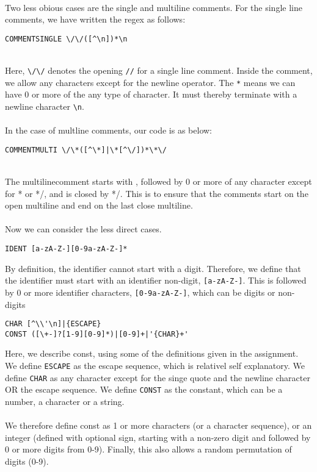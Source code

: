 \documentclass{article}
\begin{document}
\\
Two less obious cases are the single and multiline comments. For the single line comments, we have written the regex as follows:
\begin{verbatim}
COMMENTSINGLE \/\/([^\n])*\n
\end{verbatim}
\\
Here, \verb|\/\/| denotes the opening \verb|//| for a single line comment. Inside the comment, we allow any characters except for the newline operator. The \verb|*| means we can have 0 or more of the any type of character. It must thereby terminate with a newline character \verb|\n|.\\
\\
In the case of multline comments, our code is as below:
\begin{verbatim}
COMMENTMULTI \/\*([^\*]|\*[^\/])*\*\/
\end{verbatim}
\\
The multilinecomment starts with \*, followed by 0 or more of any character except for * or */, and is closed by */. This is to ensure that the comments start on the open multiline and end on the last close multiline.\\
\\
Now we can consider the less direct cases.
\begin{verbatim}
IDENT [a-zA-Z-][0-9a-zA-Z-]*
\end{verbatim}
By definition, the identifier cannot start with a digit. Therefore, we define that the identifier must start with an identifier non-digit, \verb|[a-zA-Z-]|. This is followed by 0 or more identifier characters, \verb|[0-9a-zA-Z-]|, which can be digits or non-digits
\begin{verbatim}
CHAR [^\\'\n]|{ESCAPE}
CONST ([\+-]?[1-9][0-9]*)|[0-9]+|'{CHAR}+'
\end{verbatim}
Here, we describe const, using some of the definitions given in the assignment. We define \verb|ESCAPE| as the escape sequence, which is relativel self explanatory. We define \verb|CHAR| as any character except for the singe quote and the newline character OR the escape sequence. We define \verb|CONST| as the constant, which can be a number, a character or a string.\\
\\
We therefore define const as 1 or more characters (or a character sequence), or an integer (defined with optional sign, starting with a non-zero digit and followed by 0 or more digits from 0-9). Finally, this also allows a random permutation of digits (0-9).\\
\\
\end{document}

